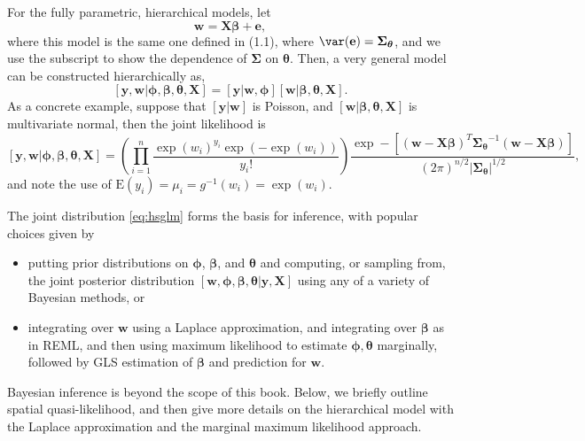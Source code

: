 \documentclass[12pt, titlepage]{article}
\begin{document}
For the fully parametric, hierarchical models, let
$$
\mathbf{w} = \mathbf{X}\boldsymbol{\beta} + \mathbf{e},
$$
where this model is the same one defined in (1.1), where $\var(\mathbf{e}) = \boldsymbol{\Sigma}_{\boldsymbol{\theta}}$, and we use the subscript to show the dependence of $\boldsymbol{\Sigma}$ on $\boldsymbol{\theta}$. Then, a very general model can be constructed hierarchically as,
\begin{equation} \label{eq:hsglm}
[\mathbf{y},\mathbf{w}|\boldsymbol{\phi},\boldsymbol{\beta},\boldsymbol{\theta},\mathbf{X}] = [\mathbf{y}|\mathbf{w},\boldsymbol{\phi}][\mathbf{w}|\boldsymbol{\beta},\boldsymbol{\theta},\mathbf{X}].
\end{equation}
As a concrete example, suppose that $[\mathbf{y}|\mathbf{w}]$ is Poisson, and $[\mathbf{w}|\boldsymbol{\beta},\boldsymbol{\theta},\mathbf{X}]$ is multivariate normal, then the joint likelihood is
$$
[\mathbf{y},\mathbf{w}|\boldsymbol{\phi},\boldsymbol{\beta},\boldsymbol{\theta},\mathbf{X}] = \left(\prod_{i=1}^{n}\frac{\exp(w_{i})^{y_{i}}\exp(-\exp(w_i))}{y_{i}!}\right)\frac{\exp-[(\mathbf{w} - \mathbf{X}\boldsymbol{\beta})^{T}\boldsymbol{\Sigma_{\boldsymbol{\theta}}}^{-1}(\mathbf{w} - \mathbf{X}\boldsymbol{\beta})]}{(2\pi)^{n/2}|\boldsymbol{\Sigma_{\boldsymbol{\theta}}}|^{1/2}},
$$
and note the use of $\textrm{E}(y_{i}) = \mu_{i} = g^{-1}(w_{i}) = \exp(w_{i})$.

The joint distribution \ref{eq:hsglm} forms the basis for inference, with popular choices given by
\begin{itemize}
\item putting prior distributions on $\boldsymbol{\phi}$, $\boldsymbol{\beta}$, and $\boldsymbol{\theta}$ and computing, or sampling from, the joint posterior distribution $[\mathbf{w},\boldsymbol{\phi},\boldsymbol{\beta},\boldsymbol{\theta}|\mathbf{y},\mathbf{X}]$ using any of a variety of Bayesian methods, or 
\item integrating over $\mathbf{w}$ using a Laplace approximation, and integrating over $\boldsymbol{\beta}$ as in REML, and then using maximum likelihood to estimate $\boldsymbol{\phi},\boldsymbol{\theta}$ marginally, followed by GLS estimation of $\boldsymbol{\beta}$ and prediction for $\mathbf{w}$.
\end{itemize}

Bayesian inference is beyond the scope of this book. Below, we briefly outline spatial quasi-likelihood, and then give more details on the hierarchical model with the Laplace approximation and the marginal maximum likelihood approach.
\end{document}
